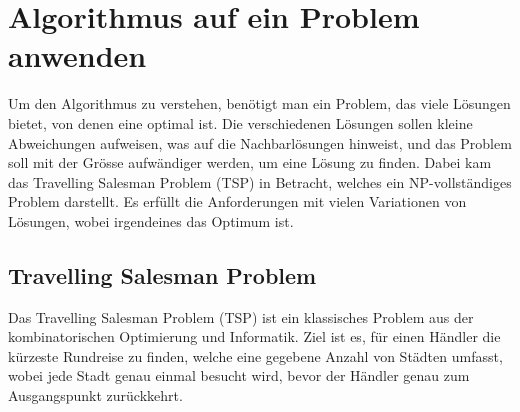 %
%
%
%
\section{Algorithmus auf ein Problem anwenden
\label{buch:paper:varalg:section:find_problem}}
Um den Algorithmus zu verstehen, benötigt man ein Problem, das 
viele Lösungen bietet, von denen eine optimal ist. Die verschiedenen 
Lösungen sollen kleine Abweichungen aufweisen, was auf die Nachbarlösungen hinweist, 
und das Problem soll mit der Grösse aufwändiger werden, um eine 
Lösung zu finden. Dabei kam das Travelling Salesman Problem (TSP) 
in Betracht, welches ein NP-vollständiges Problem darstellt. Es 
erfüllt die Anforderungen mit vielen Variationen von Lösungen, wobei
irgendeines das Optimum ist.

\subsection{Travelling Salesman Problem
\label{buch:paper:varalg:subsection:tsp}}
Das Travelling Salesman Problem (TSP) ist ein klassisches Problem 
aus der kombinatorischen Optimierung und Informatik. Ziel ist es, 
für einen Händler die kürzeste Rundreise zu finden, welche eine 
gegebene Anzahl von Städten umfasst, wobei jede Stadt 
genau einmal besucht wird, bevor der Händler genau zum Ausgangspunkt 
zurückkehrt. 

